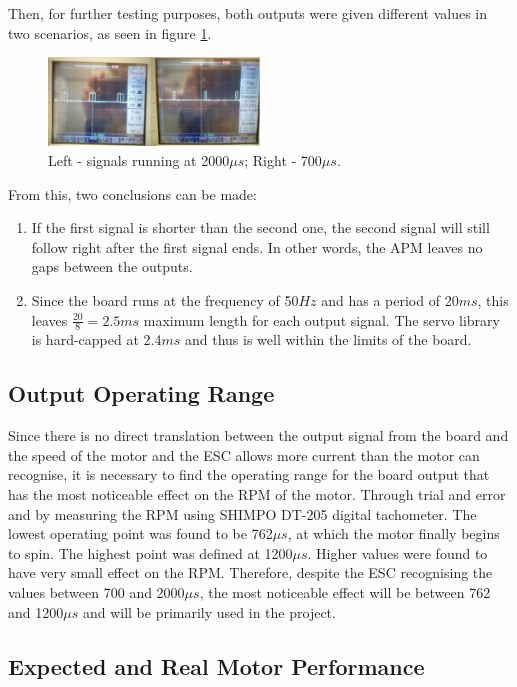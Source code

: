 Then, for further testing purposes, both outputs were given different values in two scenarios, as seen in figure \ref{oscillo3}.

\begin{figure}[H]
  \centering
    \includegraphics[width=0.5\textwidth]{images/oscillo3.png}
	\caption{Left - signals running at 2000$\mu s$; Right - 700$\mu s$.}
	\label{oscillo3}
\end{figure}

From this, two conclusions can be made:
\begin{enumerate}
\item If the first signal is shorter than the second one, the second signal will still follow right after the first signal ends. In other words, the APM leaves no gaps between the outputs.
\item Since the board runs at the frequency of 50$Hz$ and has a period of 20$ms$, this leaves $\frac{20}{8} = 2.5ms$ maximum length for each output signal. The servo library is hard-capped at 2.4$ms$ and thus is well within the limits of the board.
\end{enumerate}

\subsection{Output Operating Range}

Since there is no direct translation between the output signal from the board and the speed of the motor and the ESC allows more current than the motor can recognise, it is necessary to find the operating range for the board output that has the most noticeable effect on the RPM of the motor. Through trial and error and by measuring the RPM using SHIMPO DT-205 digital tachometer. The lowest operating point was found to be 762$\mu s$, at which the motor finally begins to spin. The highest point was defined at 1200$\mu s$. Higher values were found to have very small effect on the RPM.
Therefore, despite the ESC recognising the values between 700 and 2000$\mu s$, the most noticeable effect will be between 762 and 1200$\mu s$ and will be primarily used in the project.

\subsection{Expected and Real Motor Performance}

